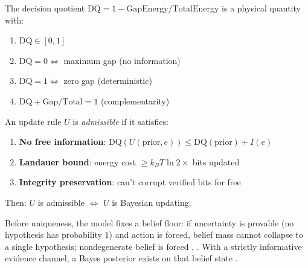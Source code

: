 \begin{theorem}\label{thm:dq-physical}
The decision quotient $\mathrm{DQ} = 1 - \text{GapEnergy}/\text{TotalEnergy}$ is a physical quantity with:
\begin{enumerate}
  \item $\mathrm{DQ} \in [0, 1]$ \quad {}
  \item $\mathrm{DQ} = 0 \Leftrightarrow$ maximum gap (no information) \quad {}
  \item $\mathrm{DQ} = 1 \Leftrightarrow$ zero gap (deterministic) \quad {}
  \item $\mathrm{DQ} + \text{Gap}/\text{Total} = 1$ (complementarity) \quad {}
\end{enumerate}
\end{theorem}

\begin{theorem}\label{thm:bayes-from-dq}
An update rule $U$ is \emph{admissible} if it satisfies:
\begin{enumerate}
  \item \textbf{No free information}: $\mathrm{DQ}(U(\text{prior}, e)) \le \mathrm{DQ}(\text{prior}) + I(e)$ \quad {}
  \item \textbf{Landauer bound}: energy cost $\ge k_BT \ln 2 \times$ bits updated \quad {}
  \item \textbf{Integrity preservation}: can't corrupt verified bits for free \quad {}
\end{enumerate}
Then: $U$ is admissible $\Leftrightarrow$ $U$ is Bayesian updating.
\end{theorem}

Before uniqueness, the model fixes a belief floor: if uncertainty is provable (no hypothesis has probability $1$) and action is forced, belief mass cannot collapse to a single hypothesis; nondegenerate belief is forced , . With a strictly informative evidence channel, a Bayes posterior exists on that belief state .

